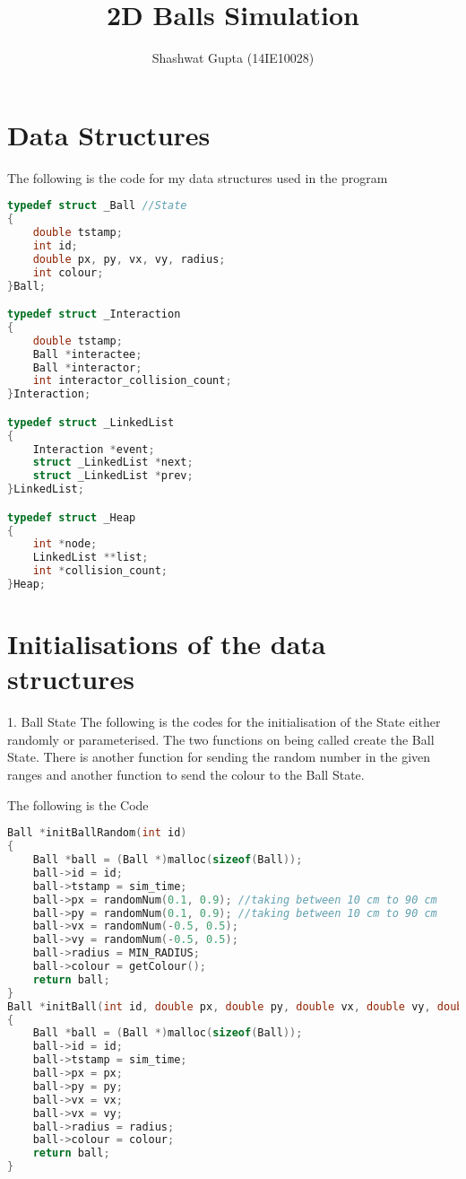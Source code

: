 \documentclass{article}
\title{2D Balls Simulation}
\author{Shashwat Gupta (14IE10028)}
\begin{document}
\maketitle

\section{Data Structures}

The following is the code for my data structures used in the program
\begin{lstlisting}[language=c, caption=Structures]
typedef struct _Ball //State
{
    double tstamp;
    int id;
    double px, py, vx, vy, radius;
    int colour;
}Ball;

typedef struct _Interaction
{
    double tstamp;
    Ball *interactee;
    Ball *interactor;
    int interactor_collision_count;
}Interaction;

typedef struct _LinkedList
{
    Interaction *event;
    struct _LinkedList *next;
    struct _LinkedList *prev;
}LinkedList;

typedef struct _Heap
{
    int *node;
    LinkedList **list;
    int *collision_count;
}Heap;
\end{lstlisting}

\section{Initialisations of the data structures}

1. Ball State
The following is the codes for the initialisation of the State either randomly or parameterised. The two functions on being called create the Ball State. There is another function for sending the random number in the given ranges and another function to send the colour to the Ball State.

The following is the Code
\begin{lstlisting}[language=c, caption=left]
Ball *initBallRandom(int id)
{
    Ball *ball = (Ball *)malloc(sizeof(Ball));
    ball->id = id;
    ball->tstamp = sim_time;
    ball->px = randomNum(0.1, 0.9); //taking between 10 cm to 90 cm
    ball->py = randomNum(0.1, 0.9); //taking between 10 cm to 90 cm
    ball->vx = randomNum(-0.5, 0.5);
    ball->vy = randomNum(-0.5, 0.5);
    ball->radius = MIN_RADIUS;
    ball->colour = getColour();
    return ball;
}
Ball *initBall(int id, double px, double py, double vx, double vy, double radius, int colour)
{
    Ball *ball = (Ball *)malloc(sizeof(Ball));
    ball->id = id;
    ball->tstamp = sim_time;
    ball->px = px;
    ball->py = py;
    ball->vx = vx;
    ball->vx = vy;
    ball->radius = radius;
    ball->colour = colour;
    return ball;
}
\end{lstlisting}
\end{document}
